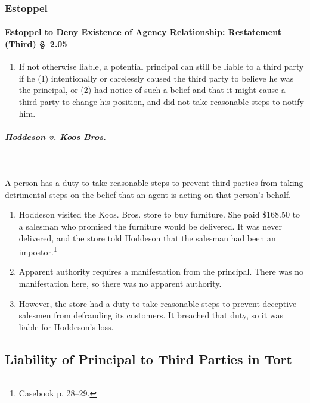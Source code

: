 \subsubsection{Estoppel}

\paragraph{Estoppel to Deny Existence of Agency Relationship: Restatement 
(Third) \S\ 2.05}

\begin{enumerate}
    \item If not otherwise liable, a potential principal can still be liable 
    to a third party if he (1) intentionally or carelessly caused the third 
    party to believe he was the principal, or (2) had notice of such a belief 
    and that it might cause a third party to change his position, and did not 
    take reasonable steps to notify him.
\end{enumerate}

\paragraph{\emph{Hoddeson v. Koos Bros.}}
~\\\\
A person has a duty to take reasonable steps to prevent third parties from taking 
detrimental steps on the belief that an agent is acting on that person's 
behalf.

\begin{enumerate}
    \item Hoddeson visited the Koos. Bros. store to buy furniture. She paid 
    \$168.50 to a salesman who promised the furniture would be delivered. It 
    was never delivered, and the store told Hoddeson that the salesman had 
    been an impostor.\footnote{Casebook p. 28--29.}
    \item Apparent authority requires a manifestation from the principal. 
    There was no manifestation here, so there was no apparent authority.
    \item However, the store had a duty to take reasonable steps to prevent 
    deceptive salesmen from defrauding its customers. It breached that duty, 
    so it was liable for Hoddeson's loss.
\end{enumerate}

\subsection{Liability of Principal to Third Parties in Tort}

